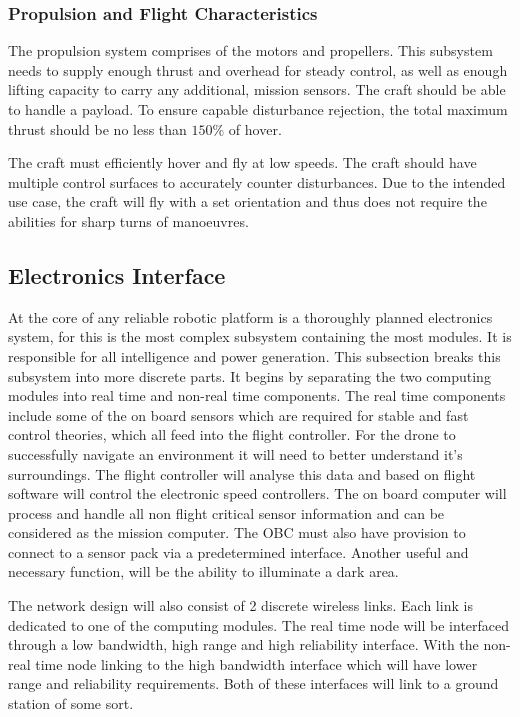 			\subsubsection{Propulsion and Flight Characteristics}
			The propulsion system comprises of the motors and propellers. This subsystem needs to supply enough thrust and overhead for steady control, as well as enough lifting capacity to carry any additional, mission sensors. The craft should be able to handle a \payLoadMass payload. To ensure capable disturbance rejection, the total maximum thrust should be no less than $150\%$ of hover.
			
			The craft must efficiently hover and fly at low speeds. The craft should have multiple control surfaces to accurately counter disturbances. Due to the intended use case, the craft will fly with a set orientation and thus does not require the abilities for sharp turns of manoeuvres.
		

		\subsection{Electronics Interface}
		At the core of any reliable robotic platform is a thoroughly planned electronics system, for \projectName this is the most complex subsystem containing the most modules. It is responsible for all intelligence and power generation. This subsection breaks this subsystem into more discrete parts. It begins by separating the two computing modules into real time and non-real time components. The real time components include some of the on board sensors which are required for stable and fast control theories, which all feed into the flight controller. For the drone to successfully navigate an environment it will need to better understand it's surroundings. The flight controller will analyse this data and based on flight software will control the electronic speed controllers. The on board computer will process and handle all non flight critical sensor information and can be considered as the mission computer. The OBC must also have provision to connect to a sensor pack via a predetermined interface. Another useful and necessary function, will be the ability to illuminate a dark area. 
		
		The network design will also consist of 2 discrete wireless links. Each link is dedicated to one of the computing modules. The real time node will be interfaced through a low bandwidth, high range and high reliability interface. With the non-real time node linking to the high bandwidth interface which will have lower range and reliability requirements. Both of these interfaces will link to a ground station of some sort.
		
